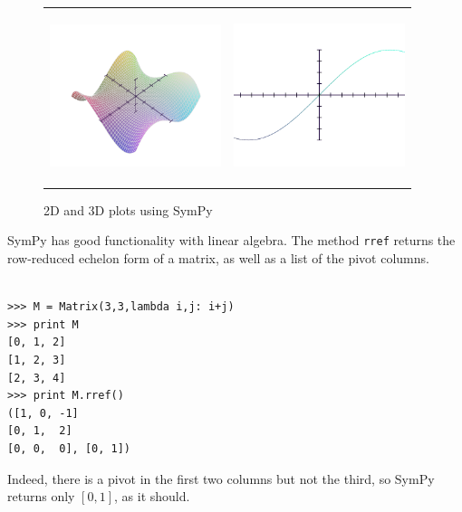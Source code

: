 \documentclass[12pt]{article}
\begin{document}
\begin{figure}[h!]
\begin{minipage}{\textwidth}
\begin{center}
\begin{tabular}{cc}
\includegraphics[height=5cm,width=5cm]{oscas-sympy-plot1b}
 &\includegraphics[height=5cm,width=5cm]{oscas-sympy-plot2b} \\
\end{tabular}
\end{center}
\end{minipage}
\caption{2D and 3D plots using SymPy}
\label{fig:sympy-plots}
\end{figure}

SymPy has good functionality with linear algebra.
The method {\tt rref} returns the row-reduced echelon form of a matrix,
as well as a list of the pivot columns.

\begin{Verbatim}[fontsize=\scriptsize,fontfamily=courier,fontshape=tt,frame=single,label=SymPy]

>>> M = Matrix(3,3,lambda i,j: i+j)
>>> print M
[0, 1, 2]
[1, 2, 3]
[2, 3, 4]
>>> print M.rref()
([1, 0, -1]
[0, 1,  2]
[0, 0,  0], [0, 1])

\end{Verbatim}

\noindent
Indeed, there is a pivot in the first two columns but not the
third, so SymPy returns only $[0,1]$, as it should.
\end{document}
